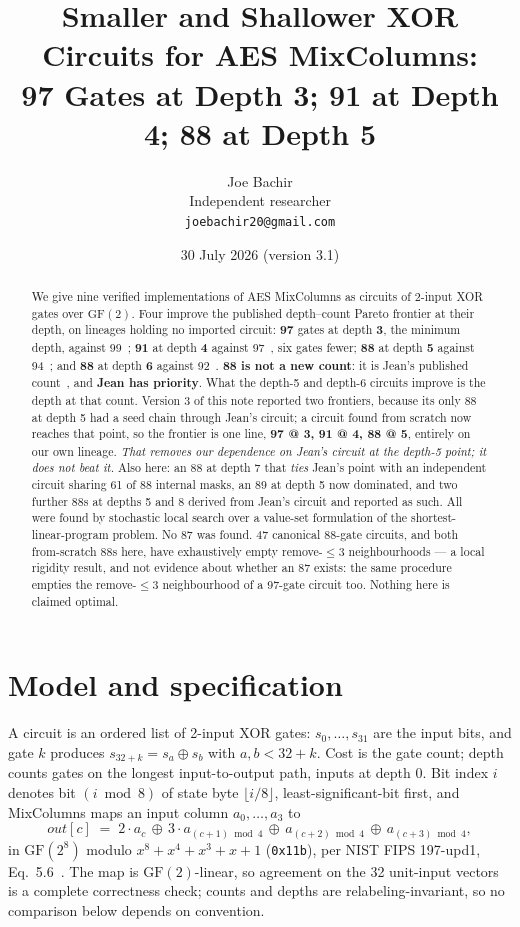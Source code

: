 \documentclass[11pt,a4paper]{article}
\title{Smaller and Shallower XOR Circuits for AES MixColumns:\\
97 Gates at Depth 3; 91 at Depth 4; 88 at Depth 5}
\author{Joe Bachir\\[2pt]
Independent researcher\\[2pt]
\texttt{joebachir20@gmail.com}}
\date{30 July 2026 (version 3.1)}
\begin{document}
\maketitle

\begin{abstract}
We give nine verified implementations of AES MixColumns as circuits of 2-input
XOR gates over $\mathrm{GF}(2)$. Four improve the published depth--count Pareto
frontier at their depth, on lineages holding no imported circuit: \textbf{97}
gates at depth \textbf{3}, the minimum depth, against 99~\cite{SFX23};
\textbf{91} at depth \textbf{4} against 97~\cite{OC24}, six gates fewer; \textbf{88} at depth
\textbf{5} against 94~\cite{OC24}; and \textbf{88} at depth \textbf{6} against
92~\cite{Max19,XZLBZ20}. \textbf{88 is not a new count}: it is Jean's
published count~\cite{Jean26}, and \textbf{Jean has priority}. What the depth-5
and depth-6 circuits improve is the depth at that count. Version 3 of this note
reported two frontiers, because its only 88 at depth 5 had a seed chain through
Jean's circuit; a circuit found from scratch now reaches that point, so
the frontier is one line, \textbf{97 @ 3, 91 @ 4, 88 @ 5}, entirely on our own
lineage. \emph{That removes our dependence on Jean's circuit at the depth-5
point; it does not beat it.} Also here: an 88 at depth 7 that \emph{ties} Jean's
point with an independent circuit sharing 61 of 88 internal masks, an 89 at
depth 5 now dominated, and two further 88s at depths 5 and 8 derived from Jean's
circuit and reported as such. All were found by stochastic local search over a
value-set formulation of the shortest-linear-program problem. No 87 was found.
47 canonical 88-gate circuits, and both from-scratch 88s here, have exhaustively
empty remove-$\le 3$ neighbourhoods --- a local rigidity result, and not
evidence about whether an 87 exists: the same procedure empties the
remove-$\le 3$ neighbourhood of a 97-gate circuit too. Nothing here is claimed
optimal.
\end{abstract}

\section{Model and specification}

A circuit is an ordered list of 2-input XOR gates: $s_0,\dots,s_{31}$ are the
input bits, and gate $k$ produces $s_{32+k} = s_a \oplus s_b$ with $a,b < 32+k$.
Cost is the gate count; depth counts gates on the longest input-to-output path,
inputs at depth 0. Bit index $i$ denotes bit $(i \bmod 8)$ of state byte
$\lfloor i/8 \rfloor$, least-significant-bit first, and MixColumns maps an input
column $a_0,\dots,a_3$ to
\[
\mathit{out}[c] \;=\; 2 \cdot a_c \,\oplus\, 3 \cdot a_{(c+1) \bmod 4}
\,\oplus\, a_{(c+2) \bmod 4} \,\oplus\, a_{(c+3) \bmod 4},
\]
in $\mathrm{GF}(2^8)$ modulo $x^8+x^4+x^3+x+1$ (\texttt{0x11b}), per NIST FIPS
197-upd1, Eq.~5.6~\cite{FIPS197}. The map is $\mathrm{GF}(2)$-linear, so
agreement on the 32 unit-input vectors is a complete correctness check; counts
and depths are relabeling-invariant, so no comparison below depends on
convention.
\end{document}
